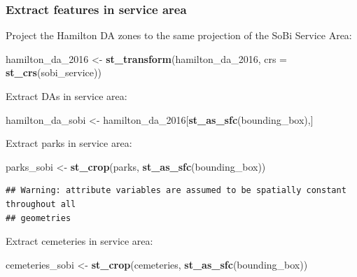 \documentclass[
]{article}
\newenvironment{Shaded}{\begin{snugshade}}{\end{snugshade}}
\newcommand{\DataTypeTok}[1]{\textcolor[rgb]{0.13,0.29,0.53}{#1}}
\newcommand{\DecValTok}[1]{\textcolor[rgb]{0.00,0.00,0.81}{#1}}
\newcommand{\KeywordTok}[1]{\textcolor[rgb]{0.13,0.29,0.53}{\textbf{#1}}}
\newcommand{\NormalTok}[1]{#1}
\newcommand{\StringTok}[1]{\textcolor[rgb]{0.31,0.60,0.02}{#1}}
\begin{document}
\hypertarget{extract-features-in-service-area}{%
\subsubsection{Extract features in service
area}\label{extract-features-in-service-area}}

Project the Hamilton DA zones to the same projection of the SoBi Service
Area:

\begin{Shaded}
\begin{Highlighting}[]
\NormalTok{hamilton_da_}\DecValTok{2016}\NormalTok{ <-}\StringTok{ }\KeywordTok{st_transform}\NormalTok{(hamilton_da_}\DecValTok{2016}\NormalTok{, }\DataTypeTok{crs =} \KeywordTok{st_crs}\NormalTok{(sobi_service))}
\end{Highlighting}
\end{Shaded}

Extract DAs in service area:

\begin{Shaded}
\begin{Highlighting}[]
\NormalTok{hamilton_da_sobi <-}\StringTok{ }\NormalTok{hamilton_da_}\DecValTok{2016}\NormalTok{[}\KeywordTok{st_as_sfc}\NormalTok{(bounding_box),]}
\end{Highlighting}
\end{Shaded}

Extract parks in service area:

\begin{Shaded}
\begin{Highlighting}[]
\NormalTok{parks_sobi <-}\StringTok{ }\KeywordTok{st_crop}\NormalTok{(parks, }\KeywordTok{st_as_sfc}\NormalTok{(bounding_box))}
\end{Highlighting}
\end{Shaded}

\begin{verbatim}
## Warning: attribute variables are assumed to be spatially constant throughout all
## geometries
\end{verbatim}

Extract cemeteries in service area:

\begin{Shaded}
\begin{Highlighting}[]
\NormalTok{cemeteries_sobi <-}\StringTok{ }\KeywordTok{st_crop}\NormalTok{(cemeteries, }\KeywordTok{st_as_sfc}\NormalTok{(bounding_box))}
\end{Highlighting}
\end{Shaded}
\end{document}
